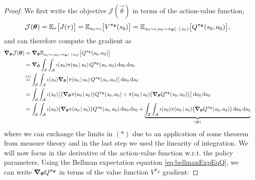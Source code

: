 		\begin{proof}
			We first write the objective \(\mathcal{J}(\vec{\theta})\) in terms of the action-value function,
			\begin{equation}
				\mathcal{J}(\bm{\theta})
				= \mathbb{E}_{\tau}\bigl[ J(\tau) \bigr]
				= \mathbb{E}_{s_0 \sim \iota}\bigl[ V^{\pi_{\bm{\theta}}}(s_0) \bigr]
				= \mathbb{E}_{s_0 \sim \iota, a_0 \sim \pi_{\bm{\theta}}(\cdot \,\vert\, s_0)}\bigl[ Q^{\pi_{\bm{\theta}}}(s_0, a_0) \bigr],
				\label{eq:pgtDecomp}
			\end{equation}
			and can therefore compute the gradient as
			\begin{align}
				\grad_{\vec{\theta}} \mathcal{J}(\vec{\theta})
				 & = \grad_{\vec{\theta}} \E_{s_0 \sim \iota, a_0 \sim \pi_{\vec{\theta}}(\cdot \given s_0)}\bigl[ Q^{\pi_{\vec{\theta}}}(s_0, a_0) \bigr]  \label{eq:pgtDecomp2}                                                                                                                                                                        \\
				 & = \grad_{\vec{\theta}} \int_\mathcal{S} \int_\mathcal{A} \iota(s_0) \pi(a_0 \given s_0) \, Q^{\pi_{\vec{\theta}}}(s_0, a_0) \dd{a_0} \dd{s_0}                                                                                                                                                                                         \\
				 & \overset{\mathclap{(\ast)}}{=} \int_\mathcal{S} \int_\mathcal{A} \iota(s_0) \grad_{\vec{\theta}} \bigl[ \pi(a_0 \given s_0) \, Q^{\pi_{\vec{\theta}}}(s_0, a_0) \bigr] \dd{a_0} \dd{s_0}                                                                                                                                              \\
				 & = \int_\mathcal{S} \int_\mathcal{A} \iota(s_0) \bigl[ \bigl( \grad_{\vec{\theta}} \pi(a_0 \given s_0) \bigr) Q^{\pi_{\vec{\theta}}}(s_0, a_0) + \pi(a_0 \given s_0) \bigl( \grad_{\vec{\theta}} Q^{\pi_{\vec{\theta}}}(s_0, a_0) \bigr) \bigr] \dd{a_0} \dd{s_0}                                                                      \\
				 & = \int_\mathcal{S} \int_\mathcal{A} \iota(s_0) \bigl( \grad_{\vec{\theta}} \pi(a_0 \given s_0) \bigr) Q^{\pi_{\vec{\theta}}}(s_0, a_0) \dd{a_0} \dd{s_0} + \underbrace{\int_\mathcal{S} \int_\mathcal{A} \iota(s_0) \pi(a_0 \given s_0) \bigl( \grad_{\vec{\theta}} Q^{\pi_{\vec{\theta}}}(s_0, a_0) \bigr) \dd{a_0} \dd{s_0}}_{(\#)}
			\end{align}
			where we can exchange the limits in \((\ast)\) due to an application of some theorem from measure theory and in the last step we used the linearity of integration. We will now focus in the derivative of the action-value function w.r.t. the policy parameters. Using the Bellman expectation equation \eqref{eq:bellmanExpEqQ}, we can write \(\grad_{\bm{\theta}} Q^{\pi_{\bm{\theta}}}\) in terms of the value function \(V^{\pi_{\vec{\theta}}}\) gradient:

\end{proof}
